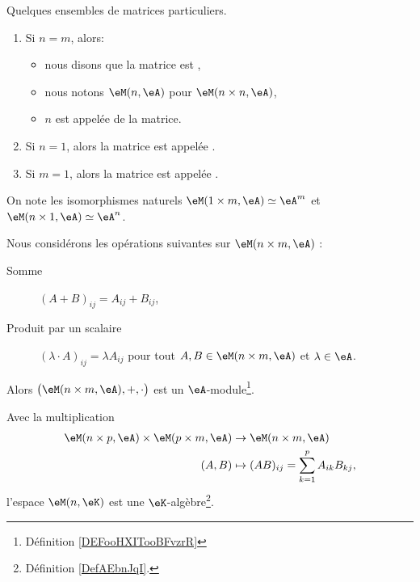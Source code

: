 \begin{definition}
	Quelques ensembles de matrices particuliers.
	\begin{enumerate}
		\item Si \( n=m\), alors:
		      \begin{itemize}
			      \item nous disons que la matrice est ,
			      \item nous notons \( \eM(n,\eA)\) pour \( \eM(n\times n,\eA)\),
			      \item \( n \) est appelée  de la matrice.
		      \end{itemize}
		\item Si \( n = 1 \), alors la matrice est appelée .
		\item Si \( m = 1 \), alors la matrice est appelée .
	\end{enumerate}
\end{definition}

\begin{normaltext}
	On note les isomorphismes naturels \( \eM(1\times m,\eA) \simeq \eA^m\) et \( \eM(n\times 1,\eA) \simeq \eA^n\).
\end{normaltext}

\begin{lemmaDef}        \label{LEMooYWTEooQyLxKv}
	Nous considérons les opérations suivantes sur \( \eM(n\times m, \eA)\) :
	\begin{description}
		\item[Somme] \( (A+B)_{ij}=A_{ij}+B_{ij}\),
		\item[Produit par un scalaire] \( (\lambda \cdot A)_{ij}=\lambda A_{ij}\) pour tout \( A,B\in \eM(n\times m,\eA ) \) et \( \lambda\in \eA \).
	\end{description}
	Alors \( \big( \eM(n\times m, \eA), +,\cdot \big)\) est un \( \eA\)-module\footnote{Définition \ref{DEFooHXITooBFvzrR}}.
\end{lemmaDef}

\begin{lemmaDef}        \label{LEMooMBZTooKdGvON}
	Avec la multiplication
	\begin{equation}
		\begin{aligned}
			\eM(n\times p,\eA)\times \eM(p\times m,\eA) & \to \eM(n\times m,\eA)                      \\
			(A,B)                                       & \mapsto (AB)_{ij}=\sum_{k=1}^pA_{ik}B_{kj},
		\end{aligned}
	\end{equation}
	l'espace \( \eM(n,\eK)\) est une \( \eK\)-algèbre\footnote{Définition \ref{DefAEbnJqI}.}.
\end{lemmaDef}

